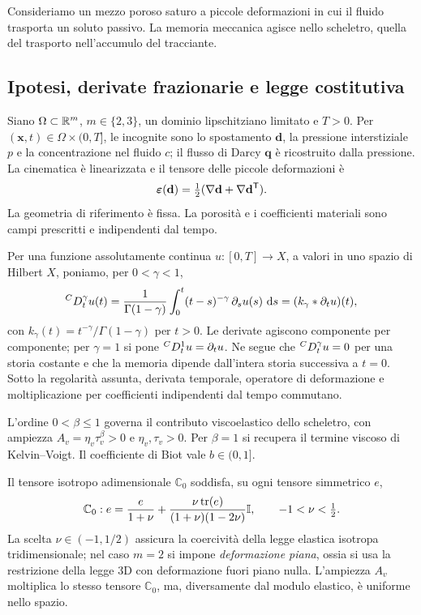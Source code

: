 Consideriamo un mezzo poroso saturo a piccole deformazioni in cui il fluido trasporta un soluto passivo. La memoria meccanica agisce nello scheletro, quella del trasporto nell'accumulo del tracciante.

\subsection{Ipotesi, derivate frazionarie e legge costitutiva}
\label{sec:forward-constitutive}

Siano $\Omega\subset\mathbb{R}^m$, $m\in\{2,3\}$, un dominio lipschitziano limitato
e $T>0$. Per $(\mathbf x,t)\in\Omega\times(0,T]$, le incognite sono lo
spostamento $\mathbf d$, la pressione interstiziale $p$ e la concentrazione
nel fluido $c$; il flusso di Darcy $\mathbf q$ \`e ricostruito dalla pressione.
La cinematica \`e linearizzata e il tensore delle piccole deformazioni \`e
\begin{equation}
 \boldsymbol{\varepsilon}(\mathbf d)=\tfrac12(\nabla\mathbf d+\nabla\mathbf d^{\mathsf T}).
 \label{eq:strain}
\end{equation}
La geometria di riferimento è fissa. La porosità e i coefficienti materiali sono campi prescritti e indipendenti dal tempo.

Per una funzione assolutamente continua $u:[0,T]\to X$, a valori in uno
spazio di Hilbert $X$, poniamo, per $0<\gamma<1$,
\begin{equation}
 {}^{C}D_t^{\gamma}u(t)=\frac{1}{\Gamma(1-\gamma)}
 \int_0^t(t-s)^{-\gamma}\,\partial_su(s)\,\,\mathrm{d} s
 = (k_\gamma*\partial_tu)(t),
 \label{eq:caputo}
\end{equation}
con $k_\gamma(t)=t^{-\gamma}/\Gamma(1-\gamma)$ per $t>0$.
Le derivate agiscono componente per componente; per $\gamma=1$ si
pone ${}^{C}D_t^{1} u=\partial_tu$. Ne segue che ${}^{C}D_t^{\gamma} u=0$ per una storia
costante e che la memoria dipende dall'intera storia successiva a $t=0$.
Sotto la regolarit\`a assunta, derivata temporale, operatore di
deformazione e moltiplicazione per coefficienti indipendenti dal tempo
commutano.

L'ordine $0<\beta\leq1$ governa il contributo viscoelastico dello scheletro, con ampiezza $A_v=\eta_v\tau_v^\beta>0$ e $\eta_v,\tau_v>0$. Per $\beta=1$ si recupera il termine viscoso di Kelvin--Voigt. Il coefficiente di Biot vale $b\in(0,1]$.

Il tensore isotropo adimensionale $\mathbb C_0$ soddisfa, su ogni tensore
simmetrico $e$,
\begin{equation}
 \mathbb C_0:e=\frac{e}{1+\nu}
 +\frac{\nu\,\mathrm{tr}(e)}{(1+\nu)(1-2\nu)}\mathbb{I},
 \qquad -1<\nu<\tfrac12 .
 \label{eq:C0}
\end{equation}
La scelta $\nu\in(-1,1/2)$ assicura la coercivit\`a della legge elastica
isotropa tridimensionale; nel caso $m=2$ si impone \emph{deformazione piana},
ossia si usa la restrizione della legge 3D con deformazione fuori piano
nulla. L'ampiezza $A_v$ moltiplica lo stesso tensore $\mathbb C_0$,
ma, diversamente dal modulo elastico, \`e uniforme nello spazio.

